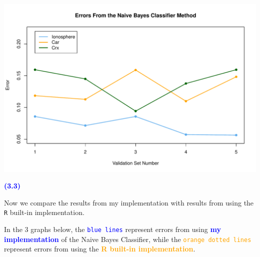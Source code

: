 \documentclass{article}
\newcommand{\code}[1]{\texttt{#1}}
\newcommand{\qnum}[1]{\noindent\textcolor{blue}{\textbf{(#1)}}}
\begin{document}
\begin{center}
    \includegraphics[width=0.9\linewidth]{Images/Prob3/Prob3-2-ErrPlot.pdf}
\end{center}
\bigskip

\bigskip





\qnum{3.3}\medskip

Now we compare the results from my implementation with results from using the \code{R} built-in implementation.

In the 3 graphs below, the \textcolor{blue}{\code{blue lines}} represent errors from using
\textcolor{blue}{\textbf{my implementation}} of the Naive Bayes Classifier, 
while the \textcolor{orange}{\code{orange dotted lines}} represent errors from using the
\textcolor{orange}{\textbf{R built-in implementation}}.
\end{document}
